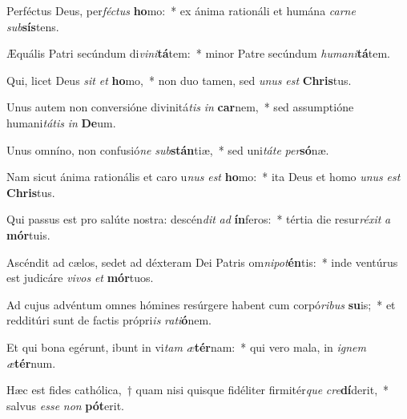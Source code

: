 \item Perféctus Deus, per\textit{féc}\textit{tus} \textbf{ho}mo:~* ex ánima rationáli et humána \textit{car}\textit{ne} \textit{sub}\textbf{sís}tens.
\item Æquális Patri secúndum di\textit{vi}\textit{ni}\textbf{tá}tem:~* minor Patre secúndum \textit{hu}\textit{ma}\textit{ni}\textbf{tá}tem.
\item Qui, licet Deus \textit{sit} \textit{et} \textbf{ho}mo,~* non duo tamen, sed \textit{u}\textit{nus} \textit{est} \textbf{Chris}tus.
\item Unus autem non conversióne divinitá\textit{tis} \textit{in} \textbf{car}nem,~* sed assumptióne humani\textit{tá}\textit{tis} \textit{in} \textbf{De}um.
\item Unus omníno, non confusió\textit{ne} \textit{sub}\textbf{stán}tiæ,~* sed uni\textit{tá}\textit{te} \textit{per}\textbf{só}næ.
\item Nam sicut ánima rationális et caro u\textit{nus} \textit{est} \textbf{ho}mo:~* ita Deus et homo \textit{u}\textit{nus} \textit{est} \textbf{Chris}tus.
\item Qui passus est pro salúte nostra: descén\textit{dit} \textit{ad} \textbf{ín}feros:~* tértia die resur\textit{ré}\textit{xit} \textit{a} \textbf{mór}tuis.
\item Ascéndit ad cælos, sedet ad déxteram Dei Patris om\textit{ni}\textit{pot}\textbf{én}tis:~* inde ventúrus est judicáre \textit{vi}\textit{vos} \textit{et} \textbf{mór}tuos.
\item Ad cujus advéntum omnes hómines resúrgere habent cum corpó\textit{ri}\textit{bus} \textbf{su}is;~* et redditúri sunt de factis própri\textit{is} \textit{ra}\textit{ti}\textbf{ó}nem.
\item Et qui bona egérunt, ibunt in vi\textit{tam} \textit{æ}\textbf{tér}nam:~* qui vero mala, in \textit{i}\textit{gnem} \textit{æ}\textbf{tér}num.
\item Hæc est fides cathólica,~† quam nisi quisque fidéliter firmitér\textit{que} \textit{cre}\textbf{dí}derit,~* salvus \textit{es}\textit{se} \textit{non} \textbf{pót}erit.
